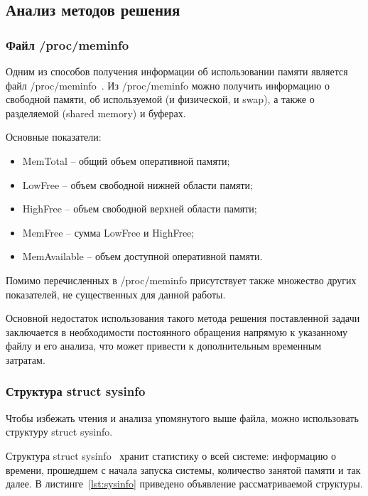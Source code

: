 \subsection{Анализ методов решения}

\subsubsection{Файл /proc/meminfo}

Одним из способов получения информации об использовании памяти является файл /proc/meminfo~\cite{meminfo}. Из /proc/meminfo можно получить информацию о свободной памяти, об используемой (и физической, и swap), а также о разделяемой (shared memory) и буферах.

Основные показатели:

\begin{itemize}
	\item MemTotal -- общий объем оперативной памяти;
	
	\item LowFree -- объем свободной нижней области памяти;
	
	\item HighFree -- объем свободной верхней области памяти;
	
	\item MemFree -- сумма LowFree и HighFree;
	
	\item MemAvailable -- объем доступной оперативной памяти.
\end{itemize}

Помимо перечисленных в /proc/meminfo присутствует также множество других показателей, не существенных для данной работы.

Основной недостаток использования такого метода решения поставленной задачи заключается в необходимости постоянного обращения напрямую к указанному файлу и его анализа, что может привести к дополнительным временным затратам.

\subsubsection{Структура struct sysinfo}

Чтобы избежать чтения и анализа упомянутого выше файла, можно использовать структуру struct sysinfo.

Структура struct sysinfo~\cite{sysinfo} хранит статистику о всей системе: информацию о времени, прошедшем с начала запуска системы, количество занятой памяти и так далее. В листинге~\ref{lst:sysinfo} приведено объявление рассматриваемой структуры.

